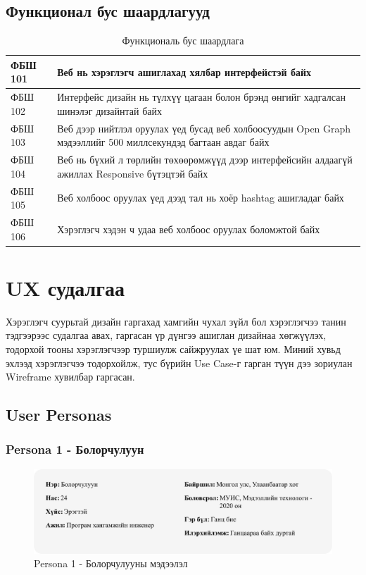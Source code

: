 \subsection{Функционал бус шаардлагууд}

	\begin{table}[h]
		\centering
		\caption{Функциональ бус шаардлага}
		\begin{tabular}{ |p{2cm}|p{13cm}| }
		\hline
		ФБШ 101 &  Веб нь хэрэглэгч ашиглахад хялбар интерфейстэй байх \\ \hline
		ФБШ 102 &  Интерфейс дизайн нь түлхүү цагаан болон брэнд өнгийг хадгалсан шинэлэг дизайнтай байх \\ \hline
		ФБШ 103 &  Веб дээр нийтлэл оруулах үед бусад веб холбоосуудын Open Graph мэдээллийг 500 миллсекундэд багтаан авдаг байх \\ \hline
		ФБШ 104 &  Веб нь бүхий л төрлийн төхөөрөмжүүд дээр интерфейсийн алдаагүй ажиллах Responsive бүтэцтэй байх \\ \hline
		ФБШ 105 &  Веб холбоос оруулах үед дээд тал нь хоёр hashtag ашигладаг байх \\ \hline
		ФБШ 106 &  Хэрэглэгч хэдэн ч удаа веб холбоос оруулах боломжтой байх \\  \hline
	\end{tabular}
	\end{table}

\section{UX судалгаа}

Хэрэглэгч суурьтай дизайн гаргахад хамгийн чухал зүйл бол хэрэглэгчээ танин тэдгээрээс судалгаа авах, гаргасан үр дүнгээ ашиглан дизайнаа хөгжүүлэх, тодорхой тооны хэрэглэгчээр туршиулж сайжруулах үе шат юм. Миний хувьд эхлээд хэрэглэгчээ тодорхойлж, тус бүрийн Use Case-г гарган түүн дээ зориулан Wireframe хувилбар гаргасан. 

\pagebreak
\subsection{User Personas}

\subsubsection{Persona 1 - Болорчулуун}

\begin{figure}[h]
	\centering
	\includegraphics[width=15cm]{images/persona1-bolorchuluun.png}
	\caption{Persona 1 - Болорчулууны мэдээлэл}
	\label{fig:persona1}
\end{figure}


